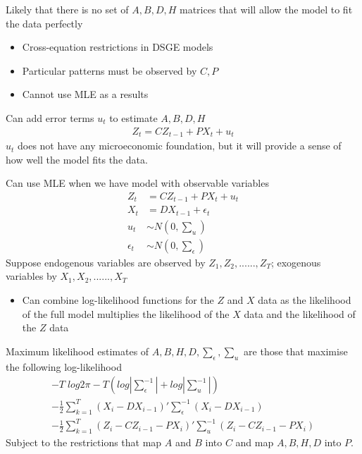 \documentclass{beamer}
\begin{document}
\begin{frame}
  Likely that there is no set of $A,B,D,H$ matrices that will allow the model to fit the data perfectly
  \begin{itemize}
    \item Cross-equation restrictions in DSGE models
    \item Particular patterns must be observed by $C,P$
    \item Cannot use MLE as a results
  \end{itemize}
  Can add error terms $u_t$ to estimate $A, B, D, H$ 
\begin{align}
  Z_t=CZ_{t-1} + PX_t + u_t
\end{align}
$u_t$ does not have any microeconomic foundation, but it will provide a sense of how well the model fits the data.
\end{frame}

\begin{frame}
  Can use MLE when we have model with observable variables  
\begin{align}  
  Z_t&=CZ_{t-1} + PX_t + u_t\\
  X_t &= DX_{t-1} + \epsilon_t\\
  u_t&\sim N(0,\sum\nolimits_u)\\
  \epsilon_t&\sim N(0,\sum\nolimits_\epsilon)
\end{align}
\medskip
 Suppose endogenous variables are observed by $Z_1,Z_2,......,Z_T$; exogenous variables by $X_1,X_2,......,X_T$
 \begin{itemize}
    \item Can combine log-likelihood functions for the $Z$ and $X$ data as the likelihood of the full model multiplies the likelihood of the $X$ data and the likelihood of the $Z$ data 
  \end{itemize} 
\end{frame}

\begin{frame}
 Maximum likelihood estimates of $A,B,H,D,\sum\nolimits_{\epsilon}, \sum\nolimits_u$ are those that maximise the following log-likelihood
\begin{align}
  -T\;log2\pi - T (log |\sum\nolimits_\epsilon^{-1}| + log |\sum\nolimits_u^{-1}|)\\
  - \frac{1}{2}\sum\nolimits_{k=1}^T(X_i-DX_{i-1})'\sum\nolimits_\epsilon^{-1}(X_i-DX_{i-1})\\
  -\frac{1}{2}\sum\nolimits_{k=1}^T(Z_i-CZ_{i-1}-PX_i)'\sum\nolimits_u^{-1}(Z_i-CZ_{i-1}-PX_i)  
\end{align}
Subject to the restrictions that map $A$ and $B$ into $C$ and map $A,B,H,D$ into $P$.  
\end{frame}
\end{document}
